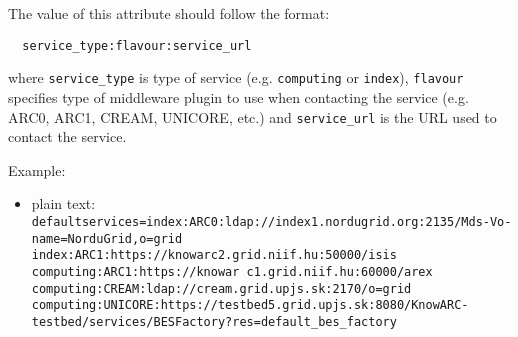 The value of this attribute should follow the format:
\begin{verbatim}
  service_type:flavour:service_url
\end{verbatim}

where \texttt{service\_type} is type of service (e.g. \texttt{computing} or
\texttt{index}), \texttt{flavour} specifies type of middleware plugin to use
when contacting the service (e.g. ARC0, ARC1, CREAM, UNICORE, etc.) and
\texttt{service\_url} is the URL used to contact the service.

Example:
\begin{itemize}
\item{plain text:}\\ 
\verb#defaultservices=index:ARC0:ldap://index1.nordugrid.org:2135/Mds-Vo-name=NorduGrid,o=grid index:ARC1:https://knowarc2.grid.niif.hu:50000/isis computing:ARC1:https://knowar c1.grid.niif.hu:60000/arex computing:CREAM:ldap://cream.grid.upjs.sk:2170/o=grid computing:UNICORE:https://testbed5.grid.upjs.sk:8080/KnowARC-testbed/services/BESFactory?res=default_bes_factory#
\end{itemize}

